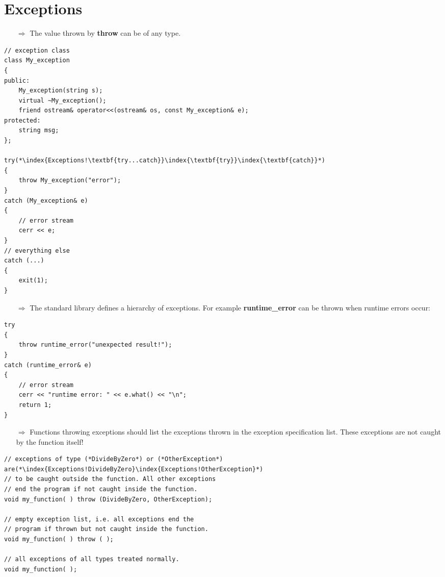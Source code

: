 \documentclass[10pt]{article}
\begin{document}
\section{Exceptions}
\small
\begin{enumerate}
\item[$\Rightarrow$] The value thrown by
\textbf{throw} can be of any type.
\end{enumerate}
\begin{lstlisting}
// exception class
class My_exception
{
public:
    My_exception(string s);
    virtual ~My_exception();
    friend ostream& operator<<(ostream& os, const My_exception& e);
protected:
    string msg;
};

try(*\index{Exceptions!\textbf{try...catch}}\index{\textbf{try}}\index{\textbf{catch}}*)
{
    throw My_exception("error");
}
catch (My_exception& e)
{
    // error stream
    cerr << e;
}
// everything else
catch (...)
{
    exit(1);
}
\end{lstlisting}
\begin{enumerate}
\item[$\Rightarrow$] The standard library defines a hierarchy of exceptions.  For example \textbf{runtime\_error} can be 
thrown when runtime errors occur:
\end{enumerate}
\begin{lstlisting}
try
{
    throw runtime_error("unexpected result!");
}
catch (runtime_error& e)
{
    // error stream
    cerr << "runtime error: " << e.what() << "\n";
    return 1;
}
\end{lstlisting}
\begin{enumerate}
\item[$\Rightarrow$] Functions throwing exceptions should list the exceptions thrown in
the exception specification list. These exceptions are not 
caught by the function itself!
\end{enumerate}
\begin{lstlisting}
// exceptions of type (*DivideByZero*) or (*OtherException*) are(*\index{Exceptions!DivideByZero}\index{Exceptions!OtherException}*)
// to be caught outside the function. All other exceptions 
// end the program if not caught inside the function.
void my_function( ) throw (DivideByZero, OtherException);

// empty exception list, i.e. all exceptions end the
// program if thrown but not caught inside the function.
void my_function( ) throw ( );

// all exceptions of all types treated normally.
void my_function( );
\end{lstlisting}
\end{document}
